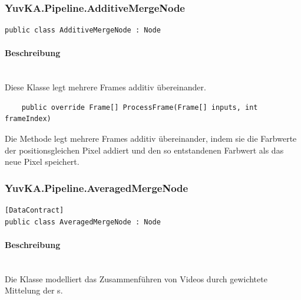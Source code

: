 \subsubsection{YuvKA.Pipeline.AdditiveMergeNode}

\begin{verbatim}
public class AdditiveMergeNode : Node
\end{verbatim}

\paragraph{Beschreibung}~\\
Diese Klasse  legt mehrere Frames additiv übereinander.

\begin{itemize}

\begin{verbatim}
	public override Frame[] ProcessFrame(Frame[] inputs, int frameIndex)
\end{verbatim}
Die Methode  legt mehrere Frames additiv übereinander, indem sie die Farbwerte der positionsgleichen Pixel addiert und den so entstandenen Farbwert als das neue Pixel speichert.
\end{itemize}

\subsubsection{YuvKA.Pipeline.AveragedMergeNode}

\begin{verbatim}
[DataContract]
public class AveragedMergeNode : Node
\end{verbatim}

\paragraph{Beschreibung}~\\
Die Klasse  modelliert das Zusammenführen von Videos durch gewichtete Mittelung der s.

